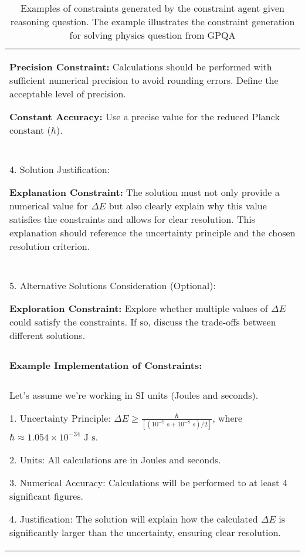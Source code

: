 \begin{table*}
\begin{tabular}{p{\linewidth}}
\textbf{Precision Constraint:} Calculations should be performed with sufficient numerical precision to avoid rounding errors. Define the acceptable level of precision.

\textbf{Constant Accuracy:} Use a precise value for the reduced Planck constant ($\hbar$).
\\\\
4. Solution Justification:

\textbf{Explanation Constraint:} The solution must not only provide a numerical value for $\Delta E$ but also clearly explain why this value satisfies the constraints and allows for clear resolution. This explanation should reference the uncertainty principle and the chosen resolution criterion.
\\\\
5. Alternative Solutions Consideration (Optional):

\textbf{Exploration Constraint:} Explore whether multiple values of $\Delta E$ could satisfy the constraints. If so, discuss the trade-offs between different solutions.
\\\\
\textbf{Example Implementation of Constraints:}
\\\\
Let's assume we're working in SI units (Joules and seconds).

1. Uncertainty Principle: $\Delta E \geq \frac{\hbar}{[(10^{-9} \text{ s} + 10^{-8} \text{ s})/2]}$, where $\hbar \approx 1.054 \times 10^{-34} \text{ J s}$.

2. Units: All calculations are in Joules and seconds.

3. Numerical Accuracy: Calculations will be performed to at least 4 significant figures.

4. Justification: The solution will explain how the calculated $\Delta E$ is significantly larger than the uncertainty, ensuring clear resolution.

 \\ \bottomrule
\end{tabular}
\caption{Examples of constraints generated by the constraint agent given reasoning question. The example illustrates the constraint generation for solving physics question from GPQA}
\label{tab:gpqa_constraints_examples}
\end{table*}